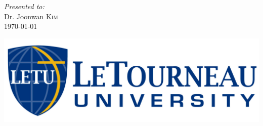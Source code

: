 \begin{titlepage}
\Large{\emph{Presented to:} \\
Dr. Joonwan \textsc{Kim}}\\[2cm]


{\Large \df\today}\\[2cm] %

\vfill %

\includegraphics[scale=0.20]{logoHoriz.jpg}\\[1cm] %


\end{titlepage}
